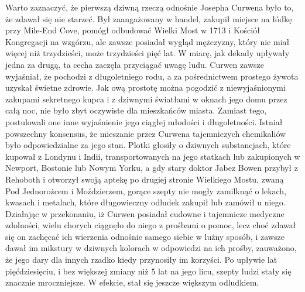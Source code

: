 Warto zaznaczyć, że pierwszą dziwną rzeczą odnośnie Josepha Curwena było to, że zdawał się nie starzeć. Był zaangażowany w handel, zakupił miejsce na łódkę przy Mile-End Cove, pomógł odbudować Wielki Most w 1713 i Kościół Kongregacji na wzgórzu, ale zawsze posiadał wygląd mężczyzny, który nie miał więcej niż trzydzieści, może trzydzieści pięć lat. W miarę, jak dekady upływały jedna za drugą, ta cecha zaczęła przyciągać uwagę ludu. Curwen zawsze wyjaśniał, że pochodzi z długoletniego rodu, a za pośrednictwem prostego żywota uzyskał świetne zdrowie. Jak ową prostotę można pogodzić z niewyjaśnionymi zakupami sekretnego kupca i z dziwnymi światłami w oknach jego domu przez całą noc, nie było zbyt oczywiste dla mieszkańców miasta. Zamiast tego, postulowali one inne wyjaśnienie jego ciągłej młodości i długoletności. Istniał powszechny konsensus, że mieszanie przez Curwena tajemniczych chemikaliów było odpowiedzialne za jego stan. Plotki głosiły o dziwnych substancjach, które kupował z Londynu i Indii, transportowanych na jego statkach lub zakupionych w Newport, Bostonie lub Nowym Yorku, a gdy stary doktor Jabez Bowen przybył z Rehoboth i otworzył swoją aptekę po drugiej stronie Wielkiego Mostu, zwaną Pod Jednorożcem i Moździerzem, gorące szepty nie mogły zamilknąć o lekach, kwasach i metalach, które długowieczny odludek zakupił lub zamówił u niego. Działając w przekonaniu, iż Curwen posiadał cudowne i tajemnicze medyczne zdolności, wielu chorych ciągnęło do niego z prośbami o pomoc, lecz choć zdawał się on zachęcać ich wierzenia odnośnie samego siebie w luźny sposób, i zawsze dawał im mikstury w dziwnych kolorach w odpowiedzi na ich prośby, zauważono, że jego dary dla innych rzadko kiedy przynosiły im korzyści. Po upływie lat pięćdziesięciu, i bez większej zmiany niż 5 lat na jego licu, szepty ludzi stały się znacznie mroczniejsze. W efekcie, stał się jeszcze większym odludkiem.

